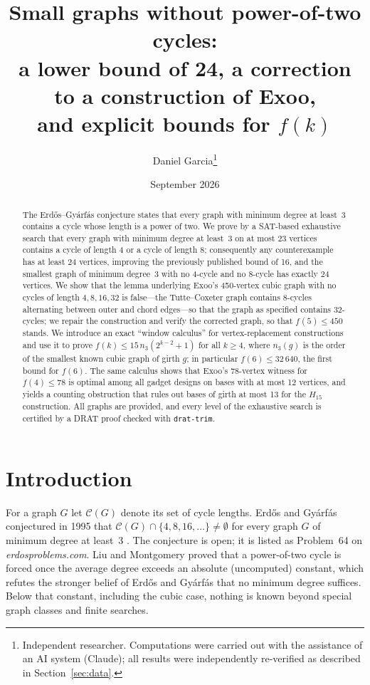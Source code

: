 \documentclass[11pt]{article}
\title{Small graphs without power-of-two cycles:\\
a lower bound of 24, a correction to a construction of Exoo,\\
and explicit bounds for $f(k)$}
\author{Daniel Garcia\thanks{Independent researcher. Computations were carried out with the assistance of an AI system (Claude); all results were independently re-verified as described in Section~\ref{sec:data}.}}
\date{September 2026}
\theoremstyle{remark}
\theoremstyle{definition}
\newcommand{\Cyc}{\mathcal{C}}
\begin{document}
\maketitle

\begin{abstract}
The Erd\H{o}s--Gy\'arf\'as conjecture states that every graph with minimum degree at least~3 contains a cycle whose length is a power of two. We prove by a SAT-based exhaustive search that every graph with minimum degree at least~3 on at most 23 vertices contains a cycle of length 4 or a cycle of length 8; consequently any counterexample has at least 24 vertices, improving the previously published bound of 16, and the smallest graph of minimum degree~3 with no 4-cycle and no 8-cycle has exactly 24 vertices. We show that the lemma underlying Exoo's 450-vertex cubic graph with no cycles of length $4,8,16,32$ is false---the Tutte--Coxeter graph contains 8-cycles alternating between outer and chord edges---so that the graph as specified contains 32-cycles; we repair the construction and verify the corrected graph, so that $f(5)\le 450$ stands. We introduce an exact ``window calculus'' for vertex-replacement constructions and use it to prove $f(k)\le 15\,n_3(2^{k-2}+1)$ for all $k\ge 4$, where $n_3(g)$ is the order of the smallest known cubic graph of girth $g$; in particular $f(6)\le 32\,640$, the first bound for $f(6)$. The same calculus shows that Exoo's 78-vertex witness for $f(4)\le 78$ is optimal among all gadget designs on bases with at most 12 vertices, and yields a counting obstruction that rules out bases of girth at most 13 for the $H_{15}$ construction. All graphs are provided, and every level of the exhaustive search is certified by a DRAT proof checked with \texttt{drat-trim}.
\end{abstract}

\section{Introduction}

For a graph $G$ let $\Cyc(G)$ denote its set of cycle lengths. Erd\H{o}s and Gy\'arf\'as conjectured in 1995 that $\Cyc(G)\cap\{4,8,16,\dots\}\neq\emptyset$ for every graph $G$ of minimum degree at least~3 \cite{Erdos97}. The conjecture is open; it is listed as Problem~64 on \emph{erdosproblems.com}. Liu and Montgomery \cite{LiuMontgomery} proved that a power-of-two cycle is forced once the average degree exceeds an absolute (uncomputed) constant, which refutes the stronger belief of Erd\H{o}s and Gy\'arf\'as that no minimum degree suffices. Below that constant, including the cubic case, nothing is known beyond special graph classes and finite searches.
\end{document}

